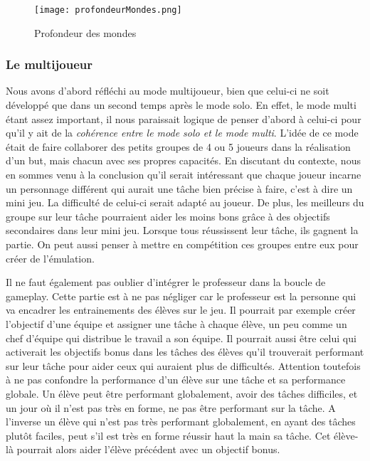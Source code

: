 \begin{figure}[H]
    \begin{center}
    \texttt{[image: profondeurMondes.png]}
    \end{center}
    \caption{Profondeur des mondes}
\label{ProfondeurMondes}
\end{figure}

\subsubsection{Le multijoueur}Nous avons d'abord réfléchi au mode multijoueur, bien que celui-ci ne soit développé que dans un second temps après le mode solo. En effet, le mode multi
étant assez important, il nous paraissait logique de penser d'abord à celui-ci pour qu'il y ait de la \emph{cohérence entre le mode solo et le mode multi}. L'idée de ce mode était de
faire collaborer des petits groupes de 4 ou 5 joueurs dans la réalisation d'un but, mais chacun avec ses propres capacités. En discutant du contexte, nous en sommes venu à la
conclusion qu'il serait intéressant que chaque joueur incarne un personnage différent qui aurait une tâche bien précise à faire, c'est à dire un mini jeu. La difficulté de celui-ci
serait adapté au joueur. De plus, les meilleurs du groupe sur leur tâche pourraient aider les moins bons grâce à des objectifs secondaires dans leur mini jeu. Lorsque tous réussissent
leur tâche, ils gagnent la partie. On peut aussi penser à mettre en compétition ces groupes entre eux pour créer de l'émulation.

Il ne faut également pas oublier d'intégrer le professeur dans la boucle de gameplay. Cette partie est à ne pas négliger car le professeur est la personne qui va encadrer les
entrainements des élèves sur le jeu. Il pourrait par exemple créer l'objectif d'une équipe et assigner une tâche à chaque élève, un peu comme un chef d'équipe qui distribue le travail
a son équipe. Il pourrait aussi être celui qui activerait les objectifs bonus dans les tâches des élèves qu'il trouverait performant sur leur tâche pour aider ceux qui auraient plus de
difficultés. Attention toutefois à ne pas confondre la performance d'un élève sur une tâche et sa performance globale. Un élève peut être performant globalement, avoir des tâches
difficiles, et un jour où il n'est pas très en forme, ne pas être performant sur la tâche. A l'inverse un élève qui n'est pas très performant globalement, en ayant des tâches plutôt
faciles, peut s'il est très en forme réussir haut la main sa tâche. Cet élève-là pourrait alors aider l'élève précédent avec un objectif bonus.

